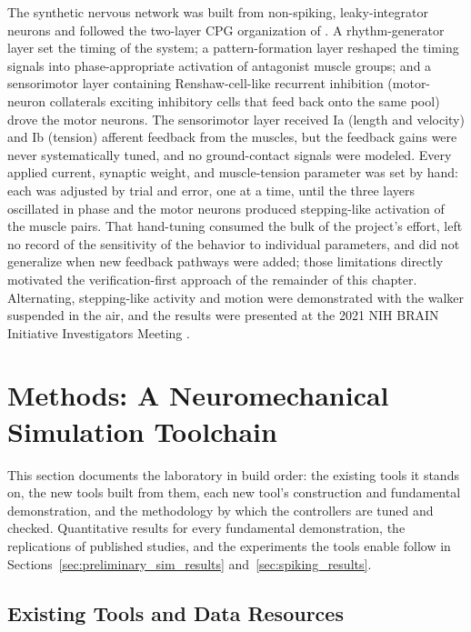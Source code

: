 The synthetic nervous network was built from non-spiking, leaky-integrator neurons and followed the two-layer CPG organization of \citet{deng_neuromechanical_2019}. A rhythm-generator layer set the timing of the system; a pattern-formation layer reshaped the timing signals into phase-appropriate activation of antagonist muscle groups; and a sensorimotor layer containing Renshaw-cell-like recurrent inhibition (motor-neuron collaterals exciting inhibitory cells that feed back onto the same pool) drove the motor neurons. The sensorimotor layer received Ia (length and velocity) and Ib (tension) afferent feedback from the muscles, but the feedback gains were never systematically tuned, and no ground-contact signals were modeled. Every applied current, synaptic weight, and muscle-tension parameter was set by hand: each was adjusted by trial and error, one at a time, until the three layers oscillated in phase and the motor neurons produced stepping-like activation of the muscle pairs. That hand-tuning consumed the bulk of the project's effort, left no record of the sensitivity of the behavior to individual parameters, and did not generalize when new feedback pathways were added; those limitations directly motivated the verification-first approach of the remainder of this chapter. Alternating, stepping-like activity and motion were demonstrated with the walker suspended in the air, and the results were presented at the 2021 NIH BRAIN Initiative Investigators Meeting \citep{bolenTorqueValuesArtificialKnee2021June15-17}.

\section{Methods: A Neuromechanical Simulation Toolchain}\label{sec:preliminary_sim_methods}

This section documents the laboratory in build order: the existing tools it stands on, the new tools built from them, each new tool's construction and fundamental demonstration, and the methodology by which the controllers are tuned and checked. Quantitative results for every fundamental demonstration, the replications of published studies, and the experiments the tools enable follow in Sections~\ref{sec:preliminary_sim_results} and~\ref{sec:spiking_results}.

\subsection{Existing Tools and Data Resources}\label{sec:sns_existing_tools}

